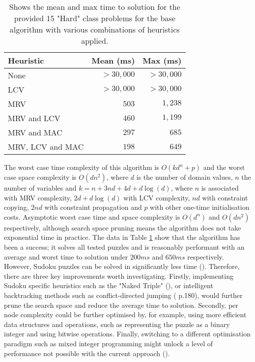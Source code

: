 \documentclass[twocolumn]{article}
\begin{document}
\begin{table}[H]
    \centering
    \begin{tabular}{lrr}
    \toprule
    \textbf{Heuristic} & \textbf{Mean (ms)} & \textbf{Max (ms)} \\
    \midrule
    None                     & $> 30,000$ & $> 30,000$ \\
    LCV                      & $> 30,000$ & $> 30,000$ \\
    MRV                      & $503$       & $1,238$  \\
    MRV and LCV             & $460$       & $1,199$  \\
    MRV and MAC             & $297$       & $685$   \\
    MRV, LCV and MAC        & $198$       & $649$   \\
    \bottomrule
    \end{tabular}
    \caption{Shows the mean and max time to solution for the provided 15 "Hard" class problems for the base algorithm with various combinations of heuristics applied.}
    \label{table:kysymys}
\end{table}

The worst case time complexity of this algorithm is $O(kd^n+p)$ and the worst case space complexity is $O(dn^2)$, where $d$ is the number of domain values, $n$ the number of variables and $k=n + 3nd + 4d + d\log(d)$, where $n$ is associated with MRV complexity, $2d + d\log(d)$ with LCV complexity, $nd$ with constraint copying, $2nd$ with constraint propagation and $p$ with other one-time initialisation costs. Asymptotic worst case time and space complexity is $O(d^n)$ and $O(dn^2)$ respectively, although search space pruning means the algorithm does not take exponential time in practice.
\newline
\newline
The data in Table \ref{table:kysymys} show that the algorithm has been a success; it solves all tested puzzles and is reasonably performant with an average and worst time to solution under $200ms$ and $650ms$ respectively. However, Sudoku puzzles can be solved in significantly less time (\cite{edi}). Therefore, there are three key improvements worth investigating. Firstly, implementing Sudoku specific heuristics such as the "Naked Triple" (\cite{sudoku}), or intelligent backtracking methods such as conflict-directed jumping (\cite{norvig} p.180), would further prune the search space and reduce the average time to solution. Secondly, per node complexity could be further optimised by, for example, using more efficient data structures and operations, such as representing the puzzle as a binary integer and using bitwise operations. Finally, switching to a different optimisation paradigm such as mixed integer programming might unlock a level of performance not possible with the current approach (\cite{edi}).

\printbibliography
\end{document}
